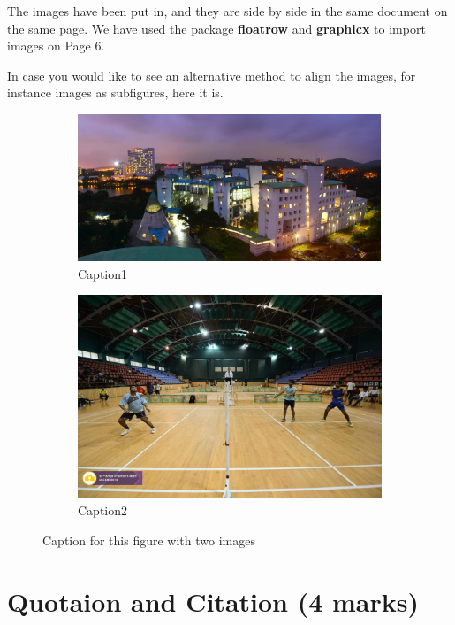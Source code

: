 \documentclass[a4paper,12pt]{article}
\begin{document}
 \setlength{\parindent}{1em}
The images have been put in, and they are side by side in the same document on the same page. We have used the package {\bf floatrow} and {\bf graphicx} to import images on Page 6.
\par In case you would like to see an alternative method to align the images, for instance images as subfigures, here it is.
\begin{figure}[H]
\centering
\begin{subfigure}{.5\textwidth}
  \centering
  \includegraphics[width=.9\linewidth, height = 4.4cm]{3.jpg}
  \caption{Caption1}
  \label{fig:sub1}
\end{subfigure}%
\begin{subfigure}{.5\textwidth}
  \centering
  \includegraphics[width=.9\linewidth]{4.jpg}
  \caption{Caption2}
  \label{fig:sub2}
\end{subfigure}
\caption{Caption for this figure with two images}
\label{fig:test}
\end{figure}
\pagebreak
\section{\textbf{Quotaion and Citation (4 marks)}}
\end{document}
